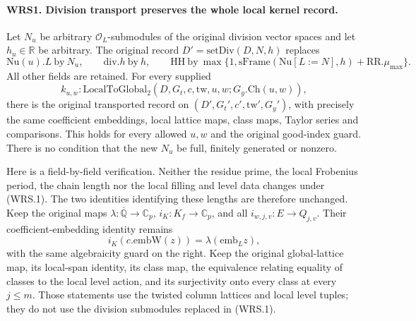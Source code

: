 \documentclass[11pt,a4paper]{article}
\numberwithin{equation}{section}
\theoremstyle{remark}\newtheorem{remark}[theorem]{Remark}
\begin{document}
\paragraph{WRS1. Division transport preserves the whole local kernel record.}
\label{claim:WRS1}
Let \(N_u\) be arbitrary \(\mathcal O_L\)-submodules of the original
division vector spaces and let \(h_u\in\mathbb R\) be arbitrary.
The original record
\(D'=\mathrm{setDiv}(D,N,h)\) replaces
\[
 \mathrm{Nu}(u).L\ \text{by}\ N_u,\qquad
 \mathrm{div}.h\ \text{by}\ h,\qquad
 \mathrm{HH}\ \text{by}\
 \max\{1,\mathrm{sFrame}(\mathrm{Nu}[L:=N],h)+\mathrm{RR}.\mu_{\max}\}.
 \tag{WRS.1}
\]
All other fields are retained.  For every supplied
\[
 k_{u,w}:\mathrm{LocalToGlobal}_2
       (D,G_t,c,\mathrm{tw},u,w;G_y.\mathrm{Ch}(u,w)),
\]
there is the original transported record on
\((D',G_t',c',\mathrm{tw}',G_y')\), with precisely the same
coefficient embeddings, local lattice maps, class maps, Taylor series
and comparisons.  This holds for every allowed \(u,w\) and the
original good-index guard.  There is no condition that the new
\(N_u\) be full, finitely generated or nonzero.

Here is a field-by-field verification.  Neither the residue prime, the
local Frobenius period, the chain length nor the local filling and level
data changes under (WRS.1).  The two identities identifying these
lengths are therefore unchanged.  Keep the original maps
\(\lambda:\overline{\mathbb Q}\to\mathbb C_p\),
\(i_K:K_f\to\mathbb C_p\), and all
\(i_{w,j,v}:E\to Q_{j,v}\).
Their coefficient-embedding identity remains
\[
 i_K(c.\mathrm{embW}(z))=\lambda(\mathrm{emb}_L z),
 \tag{WRS.2}
\]
with the same algebraicity guard on the right.
Keep the original global-lattice map, its local-span identity, its
class map, the equivalence relating equality of classes to the local
level action, and its surjectivity onto every class at every
\(j\le m\).  Those statements use the twisted column lattices and
local level tuples; they do not use the division submodules replaced
in (WRS.1).
\end{document}
